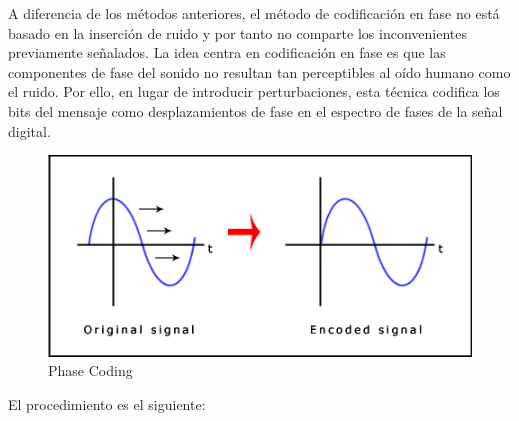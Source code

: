 \documentclass[12pt]{article}
\begin{document}
A diferencia de los métodos anteriores, el método de codificación en fase no está basado en la inserción de ruido y por tanto no comparte los inconvenientes previamente señalados. La idea centra en codificación en fase es que las componentes de fase del sonido no resultan tan perceptibles al oído humano como el ruido. Por ello, en lugar de introducir perturbaciones, esta técnica codifica los bits del mensaje como desplazamientos de fase en el espectro de fases de la señal digital.

\begin{figure}
  \centering
    \includegraphics[width=\textwidth]{img/phaseshift}
  \caption{Phase Coding}
  \label{phasecoding}
\end{figure}

El procedimiento es el siguiente:
\end{document}
